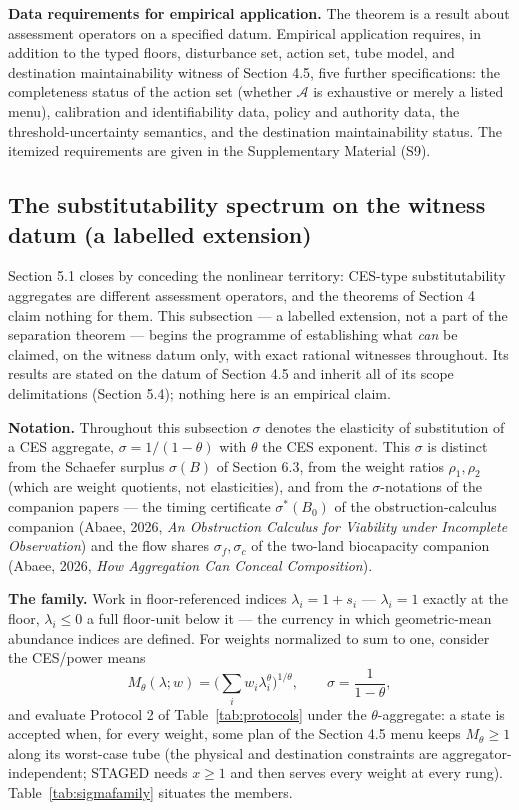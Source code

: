\documentclass[3p,11pt]{elsarticle}
\begin{document}
\textbf{Data requirements for empirical application.} The theorem is a
result about assessment operators on a specified datum. Empirical
application requires, in addition to the typed floors, disturbance set,
action set, tube model, and destination maintainability witness of
Section 4.5, five further specifications: the completeness status of the
action set (whether \(\mathcal{A}\) is exhaustive or merely a listed
menu), calibration and identifiability data, policy and authority data,
the threshold-uncertainty semantics, and the destination
maintainability status. The itemized requirements are given in the
Supplementary Material (S9).

\subsection{The substitutability spectrum on the witness datum (a
labelled extension)}\label{substitutability-spectrum}

Section 5.1 closes by conceding the nonlinear territory: CES-type
substitutability aggregates are different assessment operators, and the
theorems of Section 4 claim nothing for them. This subsection --- a
labelled extension, not a part of the separation theorem --- begins the
programme of establishing what \emph{can} be claimed, on the witness
datum only, with exact rational witnesses throughout. Its results are
stated on the datum of Section 4.5 and inherit all of its scope
delimitations (Section 5.4); nothing here is an empirical claim.

\textbf{Notation.} Throughout this subsection \(\sigma\) denotes the
elasticity of substitution of a CES aggregate, \(\sigma = 1/(1-\theta)\)
with \(\theta\) the CES exponent. This \(\sigma\) is distinct from
the Schaefer surplus \(\sigma(B)\) of Section 6.3, from the weight
ratios \(\rho_1, \rho_2\) (which are weight quotients, not
elasticities), and from the \(\sigma\)-notations of the companion
papers --- the timing certificate \(\sigma^*(B_0)\) of the
obstruction-calculus companion (Abaee, 2026, \emph{An Obstruction
Calculus for Viability under Incomplete Observation}) and the flow shares
\(\sigma_f, \sigma_c\) of the two-land biocapacity companion (Abaee,
2026, \emph{How Aggregation Can Conceal Composition}).

\textbf{The family.} Work in floor-referenced indices
\(\lambda_i = 1 + s_i\) --- \(\lambda_i = 1\) exactly at the floor,
\(\lambda_i \le 0\) a full floor-unit below it --- the currency in
which geometric-mean abundance indices are defined. For weights normalized
to sum to one, consider the CES/power means
\[M_\theta(\lambda; w) = \Big( \textstyle\sum_i w_i \lambda_i^\theta \Big)^{1/\theta},
\qquad \sigma = \frac{1}{1-\theta},\]
and evaluate Protocol 2 of Table~\ref{tab:protocols} under the
\(\theta\)-aggregate: a state is accepted when, for every weight, some
plan of the Section 4.5 menu keeps \(M_\theta \ge 1\) along its
worst-case tube (the physical and destination constraints are
aggregator-independent; STAGED needs \(x \ge 1\) and then serves every
weight at every rung). Table~\ref{tab:sigmafamily} situates the members.
\end{document}
